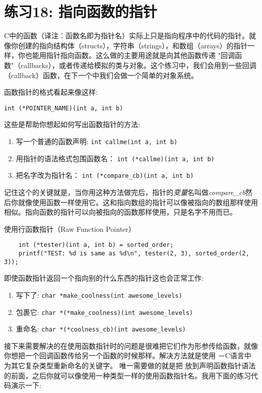 \chapter{练习18: 指向函数的指针}

C中的函数（译注：函数名即为指针名）实际上只是指向程序中的代码的指针。就像你创建的指向结构体（structs），字符串（strings），和数组（arrays）的指针一样，你也能用指针指向函数。这么做的主要用途就是向其他函数传递
"回调函数"（callbacks），或者传递给模拟的类与对象。这个练习中，我们会用到一些回调（callback）函数，在下一个中我们会做一个简单的对象系统。

函数指针的格式看起来像这样:

\verb|int (*POINTER_NAME)(int a, int b)|

这些是帮助你想起如何写出函数指针的方法:

\begin{enumerate}
\item 写一个普通的函数声明: \verb|int callme(int a, int b)|
\item 用指针的语法格式包围函数名： \verb|int (*callme)(int a, int b)|
\item 把名字改为指针名： \verb|int (*compare_cb)(int a, int b)|
\end{enumerate}

记住这个的关键就是，当你用这种方法做完后，指针的\emph{变量}名叫做\emph{compare\_cb}然后你就像使用函数一样使用它。这和指向数组的指针可以像被指向的数组那样使用相似。指向函数的指针可以向被指向的函数那样使用，只是名字不用而已。

\begin{code}{使用行函数指针（Raw Function Pointer）}
\begin{lstlisting}
    int (*tester)(int a, int b) = sorted_order;
    printf("TEST: %d is same as %d\n", tester(2, 3), sorted_order(2, 3)); 
\end{lstlisting}
\end{code}

即使函数指针返回一个指向别的什么东西的指针这也会正常工作:

\begin{enumerate}
\item 写下了: \verb|char *make_coolness(int awesome_levels)|
\item 包裹它: \verb|char *(*make_coolness)(int awesome_levels)|
\item 重命名: \verb|char *(*coolness_cb)(int awesome_levels)|
\end{enumerate}

接下来需要解决的在使用函数指针时的问题是很难把它们作为形参传给函数，就像你想把一个回调函数传给另一个函数的时候那样。解决方法就是使用 －C语言中为其它复杂类型重新命名的关键字。
唯一需要做的就是把  放到声明函数指针语法的前面，之后你就可以像使用一种类型一样的使用函数指针名。我用下面的练习代码演示一下:

